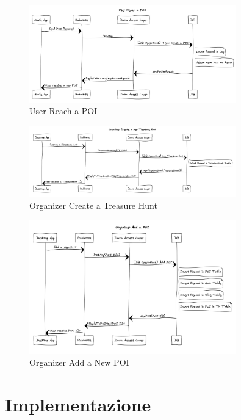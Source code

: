 \documentclass[12pt, italian]{article}
\begin{document}
\begin{figure}[H]
	\centering
	\includegraphics[width=0.8\textwidth]{img/SequenceDiagram/userReachAPOI.png}
	\caption{User Reach a POI}
\end{figure}

\begin{figure}[H]
	\centering
	\includegraphics[width=0.8\textwidth]{img/SequenceDiagram/organizerCreateTH.png}
	\caption{Organizer Create a Treasure Hunt}
\end{figure}

\begin{figure}[H]
	\centering
	\includegraphics[width=0.8\textwidth]{img/SequenceDiagram/organizerAddNewPOI.png}
	\caption{Organizer Add a New POI}
\end{figure}

\newpage
\section{Implementazione}
\end{document}

